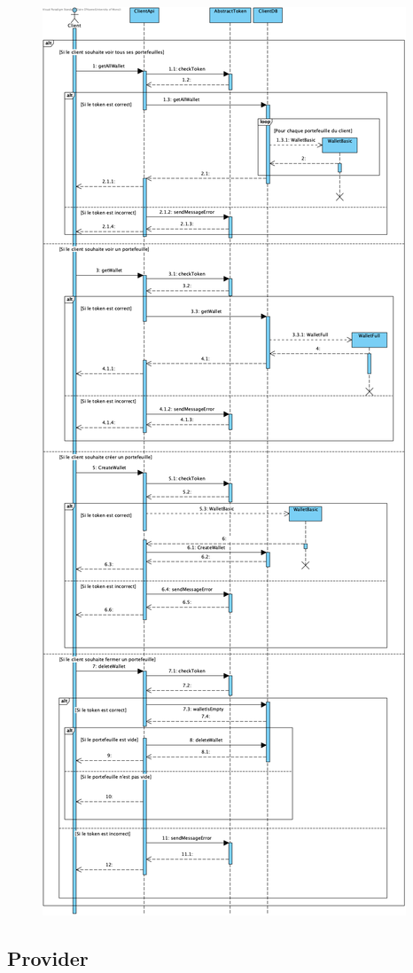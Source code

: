 \newpage
\begin{figure}[h]
\centering
\includegraphics[height = 1.2\textwidth]{sequence/client/seqPortefeuilles.png}
\end{figure}

\newpage
\subsection{Provider}